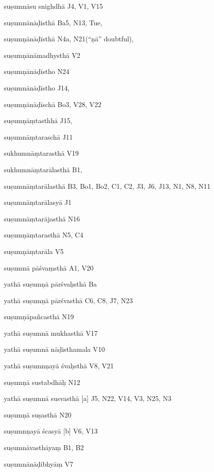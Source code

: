 \begin{ekdosis}
\begin{marma}[hp01_055]
\begin{marma}[hp02_004]
      \begin{description}

      \end{description}
    \end{marma}


    \begin{marma}[hp02_006]
    \item[suṣumnāsu snighdhā] J4, V1, V15
    \item[suṣumnānāḍisthā] Ba5, N13, Tue, 
    \item[suṣumṇānāḍīsthā] N4a, N21(“ṇā” doubtful), 
    \item[suṣumṇānāmadhysthā] V2
    \item[suṣumṇānāḍīstho] N24
    \item[suṣumnānāḍīstho] J14,
    \item[suṣumṇānāḍīschā] Bo3, V28, V22
    \item[suṣumṇāṃtasthhā] J15,
    \item[suṣumnāṃtaraschā] J11
    \item[sukhumnāṃtarasthā] V19
    \item[sukhumnāṃtarālasthā] B1,
    \item[suṣumnāṃtarālasthā] B3, Bo1, Bo2, C1, C2, J3, J6, J13, N1, N8, N11
    \item[suṣumnāṃtarālasyā] J1
    \item[suṣumnāṃtarājasthā] N16
    \item[suṣumṇāṃtarasthā]  N5, C4
    \item[suṣumṇāṃtarāla] V5
    \item[suṣumnā pāśvaṃsthā] A1, V20
    \item[yathā suṣumṇā pārśvaḥsthā] Ba
    \item[yathā suṣumṇā pārśvasthā] C6, C8, J7, N23
    \item[suṣumṇāpañcasthā] N19
    \item[yathā suṣumnā mukhasthā] V17
    \item[yathā suṣumnā nāḍisthamala] V10
    \item[yathā suṣumnņayā śvaḥsthā] V8, V21
    \item[suṣumņā sustabdhāḥ] N12
    \item[yathā suṣumnā susvasthā][a] J5, N22, V14, V3, N25, N3
    \item[suṣumņā suṣasthā] N20
    \item[suṣumnņayā ścasyā][b] V6, V13
    \item[suṣumnāvasthāyaṃ] B1, B2
    \item[suṣumnānāḍibhyāṃ] V7

\end{marma}
\end{marma}
\end{ekdosis}
